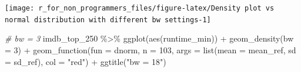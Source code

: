 \documentclass[
]{book}
\newenvironment{Shaded}{\begin{snugshade}}{\end{snugshade}}
\newcommand{\AttributeTok}[1]{\textcolor[rgb]{0.77,0.63,0.00}{#1}}
\newcommand{\CommentTok}[1]{\textcolor[rgb]{0.56,0.35,0.01}{\textit{#1}}}
\newcommand{\DecValTok}[1]{\textcolor[rgb]{0.00,0.00,0.81}{#1}}
\newcommand{\FunctionTok}[1]{\textcolor[rgb]{0.00,0.00,0.00}{#1}}
\newcommand{\NormalTok}[1]{#1}
\newcommand{\OtherTok}[1]{\textcolor[rgb]{0.56,0.35,0.01}{#1}}
\newcommand{\SpecialCharTok}[1]{\textcolor[rgb]{0.00,0.00,0.00}{#1}}
\newcommand{\StringTok}[1]{\textcolor[rgb]{0.31,0.60,0.02}{#1}}
\begin{document}
\begin{Shaded}
\end{Shaded}

\begin{center}\texttt{[image: r\_for\_non\_programmers\_files/figure-latex/Density plot vs normal distribution with different bw settings-1]} \end{center}

\begin{Shaded}
\begin{Highlighting}[]
\CommentTok{\# bw = 3}
\NormalTok{imdb\_top\_250 }\SpecialCharTok{\%\textgreater{}\%}
  \FunctionTok{ggplot}\NormalTok{(}\FunctionTok{aes}\NormalTok{(runtime\_min)) }\SpecialCharTok{+}
  \FunctionTok{geom\_density}\NormalTok{(}\AttributeTok{bw =} \DecValTok{3}\NormalTok{) }\SpecialCharTok{+}
  \FunctionTok{geom\_function}\NormalTok{(}\AttributeTok{fun =}\NormalTok{ dnorm,}
                \AttributeTok{n =} \DecValTok{103}\NormalTok{,}
                \AttributeTok{args =} \FunctionTok{list}\NormalTok{(}\AttributeTok{mean =}\NormalTok{ mean\_ref,}
                            \AttributeTok{sd =}\NormalTok{ sd\_ref),}
                \AttributeTok{col =} \StringTok{"red"}\NormalTok{) }\SpecialCharTok{+}
    \FunctionTok{ggtitle}\NormalTok{(}\StringTok{"bw = 18"}\NormalTok{)}
\end{Highlighting}
\end{Shaded}
\end{document}
